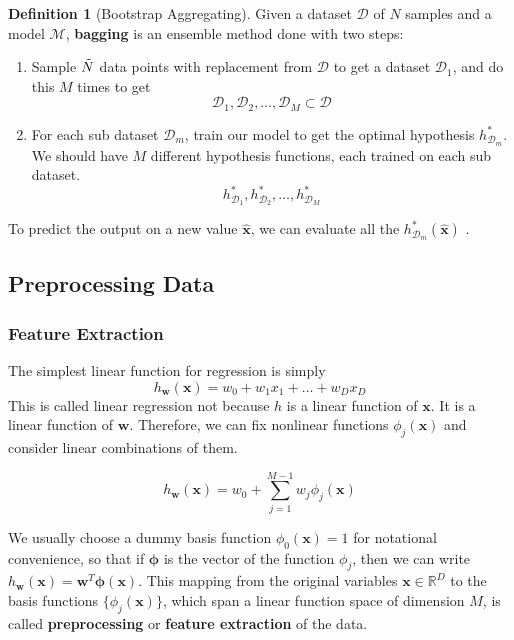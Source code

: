 \documentclass{article}
\theoremstyle{definition}
\newtheorem{definition}{Definition}[section]
\begin{document}
    \begin{definition}[Bootstrap Aggregating]
    Given a dataset $\mathcal{D}$ of $N$ samples and a model $\mathcal{M}$, \textbf{bagging} is an ensemble method done with two steps: 
    \begin{enumerate}
        \item Sample $\Tilde{N}$ data points with replacement from $\mathcal{D}$ to get a dataset $\mathcal{D}_1$, and do this $M$ times to get 
        \[\mathcal{D}_1, \mathcal{D}_2, \ldots, \mathcal{D}_M \subset \mathcal{D}\]
        \item For each sub dataset $\mathcal{D}_m$, train our model to get the optimal hypothesis $h_{\mathcal{D}_m}^\ast$. We should have $M$ different hypothesis functions, each trained on each sub dataset. 
        \[h_{\mathcal{D}_1}^\ast, h_{\mathcal{D}_2}^\ast, \ldots, h_{\mathcal{D}_M}^\ast\]
    \end{enumerate}
    To predict the output on a new value $\hat{\mathbf{x}}$, we can evaluate all the $h_{\mathcal{D}_m}^\ast (\hat{\mathbf{x}})$ .
    \end{definition}

  \subsection{Preprocessing Data}

    \subsubsection{Feature Extraction}

    The simplest linear function for regression is simply 
    \[h_\mathbf{w} (\mathbf{x}) = w_0 + w_1 x_1 + \ldots + w_D x_D\]
    This is called linear regression not because $h$ is a linear function of $\mathbf{x}$. It is a linear function of $\mathbf{w}$. Therefore, we can fix nonlinear functions $\phi_j (\mathbf{x})$ and consider linear combinations of them. 

      \[h_\mathbf{w} (\mathbf{x}) = w_0 + \sum_{j=1}^{M-1} w_j \phi_j (\mathbf{x})\]

    We usually choose a dummy basis function $\phi_0 (\mathbf{x}) = 1$ for notational convenience, so that if $\boldsymbol{\phi}$ is the vector of the function $\phi_j$, then we can write $h_\mathbf{w} (\mathbf{x}) = \mathbf{w}^T \boldsymbol{\phi} (\mathbf{x})$. This mapping from the original variables $\mathbf{x} \in \mathbb{R}^D$ to the basis functions $\{\phi_j (\mathbf{x})\}$, which span a linear function space of dimension $M$, is called \textbf{preprocessing} or \textbf{feature extraction} of the data. 
\end{document}
